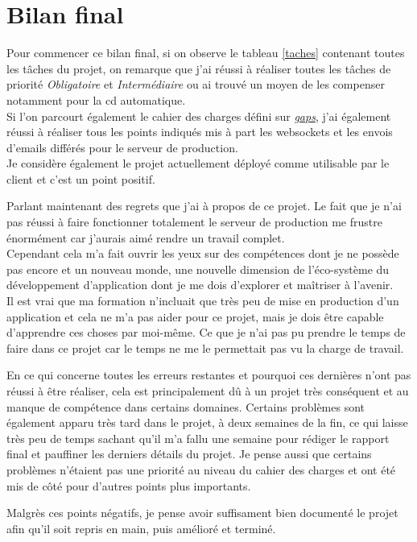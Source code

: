 \documentclass[
    iai, %
    il, %
]{heig-tb}
\begin{document}
\section{Bilan final}
Pour commencer ce bilan final, si on observe le tableau \ref{taches} contenant toutes les tâches du projet, on remarque que j'ai réussi à réaliser toutes les tâches de priorité \emph{Obligatoire} et \emph{Intermédiaire} ou ai trouvé un moyen de les compenser notamment pour la \Gls{cd} automatique. \\
Si l'on parcourt également le cahier des charges défini sur \href{https://gaps.heig-vd.ch/consultation/diplome/affichage.php?id=6135&mode=HTML}{\emph{gaps}}, j'ai également réussi à réaliser tous les points indiqués mis à part les \Gls{websockets} et les envois d'emails différés pour le serveur de production.\\
Je considère également le projet actuellement déployé comme utilisable par le client et c'est un point positif.

Parlant maintenant des regrets que j'ai à propos de ce projet. Le fait que je n'ai pas réussi à faire fonctionner totalement le serveur de production me frustre énormément car j'aurais aimé rendre un travail complet. \\
Cependant cela m'a fait ouvrir les yeux sur des compétences dont je ne possède pas encore et un nouveau monde, une nouvelle dimension de l'éco-système du développement d'application dont je me dois d'explorer et maîtriser à l'avenir. \\
Il est vrai que ma formation n'incluait que très peu de mise en production d'un application et cela ne m'a pas aider pour ce projet, mais je dois être capable d'apprendre ces choses par moi-même. Ce que je n'ai pas pu prendre le temps de faire dans ce projet car le temps ne me le permettait pas vu la charge de travail.

En ce qui concerne toutes les erreurs restantes et pourquoi ces dernières n'ont pas réussi à être réaliser, cela est principalement dû à un projet très conséquent et au manque de compétence dans certains domaines. Certains problèmes sont également apparu très tard dans le projet, à deux semaines de la fin, ce qui laisse très peu de temps sachant qu'il m'a fallu une semaine pour rédiger le rapport final et pauffiner les derniers détails du projet. Je pense aussi que certains problèmes n'étaient pas une priorité au niveau du cahier des charges et ont été mis de côté pour d'autres points plus importants.

Malgrès ces points négatifs, je pense avoir suffisament bien documenté le projet afin qu'il soit repris en main, puis amélioré et terminé.
\end{document}
